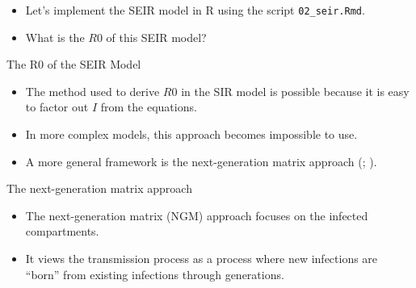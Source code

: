 \documentclass[
  ignorenonframetext,
]{beamer}
\begin{document}
\begin{frame}[fragile]
\begin{itemize}
\item
  Let's implement the SEIR model in R using the script
  \texttt{02\_seir.Rmd}.
\item
  What is the \(R0\) of this SEIR model?
\end{itemize}
\end{frame}

\begin{frame}
\begin{block}{The R0 of the SEIR Model}
\label{the-r0-of-the-seir-model}
\begin{itemize}
\item
  The method used to derive \(R0\) in the SIR model is possible because
  it is easy to factor out \(I\) from the equations.
\item
  In more complex models, this approach becomes impossible to use.
\item
  A more general framework is the next-generation matrix approach
  (; ).
\end{itemize}
\end{block}
\end{frame}

\begin{frame}
\begin{block}{The next-generation matrix approach}
\label{the-next-generation-matrix-approach}
\begin{itemize}
\item
  The next-generation matrix (NGM) approach focuses on the infected
  compartments.
\item
  It views the transmission process as a process where new infections
  are ``born'' from existing infections through generations.
\end{itemize}
\end{block}
\end{frame}
\end{document}
